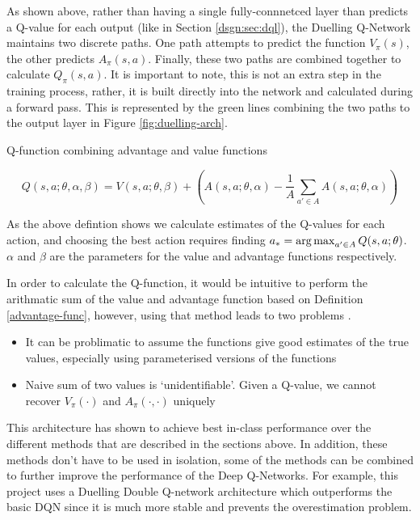 As shown above, rather than having a single fully-connnetced layer than predicts a Q-value for each output (like in Section \ref{dsgn:sec:dql}), the Duelling Q-Network maintains two discrete paths. One path attempts to predict the function $V_\pi(s)$, the other predicts $A_\pi(s, a)$. Finally, these two paths are combined together to calculate $Q_\pi(s, a)$. It is important to note, this is not an extra step in the training process, rather, it is built directly into the network and calculated during a forward pass. This is represented by the green lines combining the two paths to the output layer in Figure \ref{fig:duelling-arch}.

\begin{defn}
	Q-function combining advantage and value functions

	\[
		Q(s, a; \theta, \alpha, \beta) = V(s, a; \theta, \beta) + \left( A(s, a; \theta, \alpha) - \frac{1}{A} \sum_{a'\in A} A(s, a; \theta, \alpha) \right)
	\]
\end{defn}

As the above defintion shows we calculate estimates of the Q-values for each action, and choosing the best action requires finding $a_* = \operatorname*{arg\,max}_{a' \in A} Q(s, a; \theta)$. $\alpha$ and $\beta$ are the parameters for the value and advantage functions respectively.

In order to calculate the Q-function, it would be intuitive to perform the arithmatic sum of the value and advantage function based on Definition \ref{advantage-func}, however, using that method leads to two problems \cite{wang2015dueling}.

\begin{itemize}
	\item It can be problimatic to assume the functions give good estimates of the true values, especially using parameterised versions of the functions
	\item Naive sum of two values is `unidentifiable'. Given a Q-value, we cannot recover $V_\pi(\cdot)$ and $A_\pi(\cdot, \cdot)$ uniquely
\end{itemize}

This architecture has shown to achieve best in-class performance over the different methods that are described in the sections above. In addition, these methods don't have to be used in isolation, some of the methods can be combined to further improve the performance of the Deep Q-Networks. For example, this project uses a Duelling Double Q-network architecture which outperforms the basic DQN since it is much more stable and prevents the overestimation problem.
